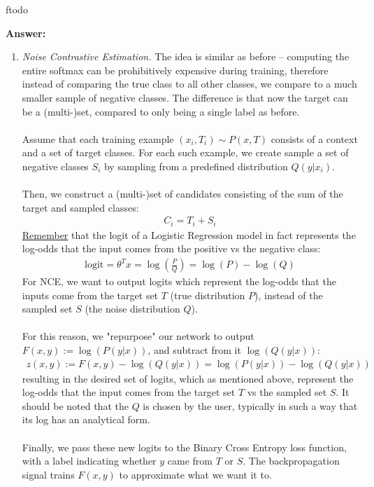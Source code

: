 ƒtodo\documentclass{article}
\newenvironment{QandA}{\begin{enumerate}[label=\arabic*.]}{\end{enumerate}}
\newenvironment{ListAlph}{\begin{enumerate}[label=(\alph*)]}{\end{enumerate}}
\newenvironment{answer}{\par\normalfont \textbf{Answer:}}{}
\newcommand{\g}{\vert}
\begin{document}
\begin{QandA}
\begin{answer}
\begin{ListAlph}
            \item \textit{Noise Contrastive Estimation.} The idea is similar as before -- computing the entire softmax can be prohibitively expensive during training, therefore instead of comparing the true class to all other classes, we compare to a much smaller sample of negative classes. The difference is that now the target can be a (multi-)set, compared to only being a single label as before.\\\\
            Assume that each training example $(x_i, T_i) \sim P(x, T)$ consists of a context and a set of target classes. For each such example, we create sample a set of negative classes $S_i$ by sampling from a predefined distribution $Q(y \g x_i)$. \\\\
            Then, we construct a (multi-)set of candidates consisting of the sum of the target and sampled classes:
            \begin{align*}
                C_i = T_i + S_i
            \end{align*}
            \href{https://math.stackexchange.com/a/4183626}{Remember} that the logit of a Logistic Regression model in fact represents the log-odds that the input comes from the positive vs the negative class:
            \begin{align*}
                \text{logit} = \theta^T x = \log \left(\frac{P}{Q} \right) = \log(P) - \log(Q)
            \end{align*}
            For NCE, we want to output logits which represent the log-odds that the inputs come from the target set $T$ (true distribution $P$), instead of the sampled set $S$ (the noise distribution $Q$). \\\\
            For this reason, we "repurpose" our network to output $F(x, y) := \log(P(y \g x))$, and subtract from it $\log(Q(y \g x))$:
            \begin{align*}
                z(x, y) := F(x, y) - \log(Q(y \g x)) = \log(P(y \g x)) - \log(Q(y \g x))
            \end{align*}
            resulting in the desired set of logits, which as mentioned above, represent the log-odds that the input comes from the target set $T$ vs the sampled set $S$. It should be noted that the $Q$ is chosen by the user, typically in such a way that its log has an analytical form. \\\\
            Finally, we pass these new logits to the Binary Cross Entropy loss function, with a label indicating whether $y$ came from $T$ or $S$. The backpropagation signal trains $F(x, y)$ to approximate what we want it to.


\end{ListAlph}
\end{answer}
\end{QandA}
\end{document}
